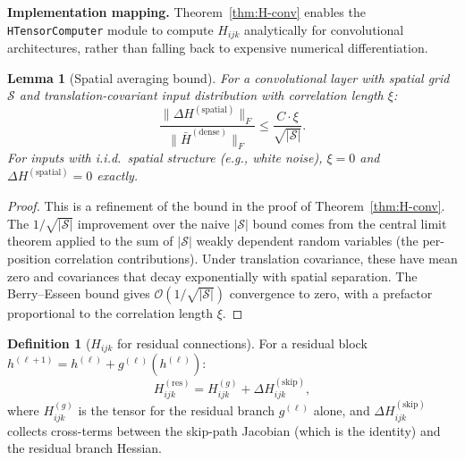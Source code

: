 \documentclass[11pt]{article}
\newtheorem{lemma}[theorem]{Lemma}
\theoremstyle{definition}
\newtheorem{definition}[theorem]{Definition}
\newcommand{\cS}{\mathcal{S}}
\newcommand{\cO}{\mathcal{O}}
\newcommand{\norm}[1]{\lVert #1 \rVert}
\begin{document}
\textbf{Implementation mapping.} Theorem~\ref{thm:H-conv} enables the \texttt{HTensorComputer} module to compute $H_{ijk}$ analytically for convolutional architectures, rather than falling back to expensive numerical differentiation.

\begin{lemma}[Spatial averaging bound]
\label{lem:spatial-averaging}
For a convolutional layer with spatial grid $\cS$ and translation-covariant input distribution with correlation length $\xi$:
\begin{equation}
\frac{\norm{\Delta H^{(\mathrm{spatial})}}_F}{\norm{\bar{H}^{(\mathrm{dense})}}_F} \le \frac{C \cdot \xi}{\sqrt{|\cS|}}.
\end{equation}
For inputs with i.i.d.\ spatial structure (e.g., white noise), $\xi = 0$ and $\Delta H^{(\mathrm{spatial})} = 0$ exactly.
\end{lemma}

\begin{proof}
This is a refinement of the bound in the proof of Theorem~\ref{thm:H-conv}. The $1/\sqrt{|\cS|}$ improvement over the naive $|\cS|$ bound comes from the central limit theorem applied to the sum of $|\cS|$ weakly dependent random variables (the per-position correlation contributions). Under translation covariance, these have mean zero and covariances that decay exponentially with spatial separation. The Berry--Esseen bound gives $\cO(1/\sqrt{|\cS|})$ convergence to zero, with a prefactor proportional to the correlation length $\xi$.
\end{proof}

\begin{definition}[$H_{ijk}$ for residual connections]
\label{def:H-skip}
For a residual block $h^{(\ell+1)} = h^{(\ell)} + g^{(\ell)}(h^{(\ell)})$:
\begin{equation}
H_{ijk}^{(\mathrm{res})} = H_{ijk}^{(g)} + \Delta H_{ijk}^{(\mathrm{skip})},
\end{equation}
where $H_{ijk}^{(g)}$ is the tensor for the residual branch $g^{(\ell)}$ alone, and $\Delta H_{ijk}^{(\mathrm{skip})}$ collects cross-terms between the skip-path Jacobian (which is the identity) and the residual branch Hessian.
\end{definition}
\end{document}
